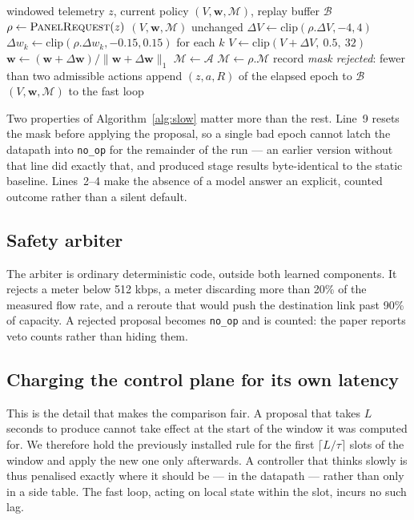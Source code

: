 \documentclass[conference]{IEEEtran}
\newcommand{\wvec}{\mathbf{w}}
\begin{document}
\begin{algorithm}[t]
\caption{Slow loop (one governance epoch)}\label{alg:slow}
\begin{algorithmic}[1]
\Require windowed telemetry $z$, current policy $(V,\wvec,\mathcal{M})$, replay buffer $\mathcal{B}$
\State $\rho \gets \textsc{PanelRequest}(z)$ 
  \State \Return $(V,\wvec,\mathcal{M})$ unchanged 
\EndIf
\State $\Delta V \gets \mathrm{clip}(\rho.\Delta V, -4, 4)$
\State $\Delta w_k \gets \mathrm{clip}(\rho.\Delta w_k, -0.15, 0.15)$ for each $k$
\State $V \gets \mathrm{clip}(V + \Delta V,\ 0.5,\ 32)$
\State $\wvec \gets (\wvec + \Delta\wvec) / \lVert \wvec + \Delta\wvec \rVert_1$
\State $\mathcal{M} \gets \mathcal{A}$ 
  \State $\mathcal{M} \gets \rho.\mathcal{M}$
\Else
  \State record \emph{mask rejected}: fewer than two admissible actions
\EndIf
\State append $(z, a, R)$ of the elapsed epoch to $\mathcal{B}$
\State \Return $(V,\wvec,\mathcal{M})$ to the fast loop
\end{algorithmic}
\end{algorithm}

Two properties of Algorithm~\ref{alg:slow} matter more than the rest. Line~9 resets
the mask before applying the proposal, so a single bad epoch cannot latch the
datapath into \texttt{no\_op} for the remainder of the run --- an earlier version
without that line did exactly that, and produced stage results byte-identical to
the static baseline. Lines~2--4 make the absence of a model answer an explicit,
counted outcome rather than a silent default.

\subsection{Safety arbiter}
The arbiter is ordinary deterministic code, outside both learned components. It
rejects a meter below 512 kbps, a meter discarding more than 20\% of the measured
flow rate, and a reroute that would push the destination link past 90\% of
capacity. A rejected proposal becomes \texttt{no\_op} and is counted: the paper
reports veto counts rather than hiding them.

\subsection{Charging the control plane for its own latency}\label{sec:lag}
This is the detail that makes the comparison fair. A proposal that takes $L$
seconds to produce cannot take effect at the start of the window it was computed
for. We therefore hold the previously installed rule for the first
$\lceil L/\tau\rceil$ slots of the window and apply the new one only afterwards. A
controller that thinks slowly is thus penalised exactly where it should be --- in
the datapath --- rather than only in a side table. The fast loop, acting on local
state within the slot, incurs no such lag.
\end{document}
